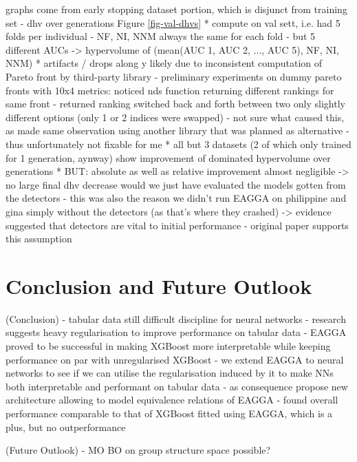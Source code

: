 \documentclass[twoside,11pt]{article}
\begin{document}
    graphs come from early stopping dataset portion, which is disjunct from training set
- dhv over generations Figure \ref{fig-val-dhvs}
  * compute on val sett, i.e. had 5 folds per individual
    - NF, NI, NNM always the same for each fold
    - but 5 different AUCs
    -> hypervolume of (mean(AUC 1, AUC 2, ..., AUC 5), NF, NI, NNM)
  * artifacts / drops along y likely due to inconsistent computation of Pareto front by third-party library
    - preliminary experiments on dummy pareto fronts with 10x4 metrics: noticed nds function returning different rankings for same front
    - returned ranking switched back and forth between two only slightly different options (only 1 or 2 indices were swapped)
    - not sure what caused this, as made same observation using another library that was planned as alternative
    - thus unfortunately not fixable for me
  * all but 3 datasets (2 of which only trained for 1 generation, aynway) show improvement of dominated hypervolume over generations
  * BUT: absolute as well as relative improvement almost negligible -> no large final dhv decrease would we just have evaluated the models gotten from the detectors
    - this was also the reason we didn't run EAGGA on philippine and gina simply without the detectors (as that's where they crashed) -> evidence suggested that detectors are vital to initial performance
    - original paper supports this assumption \citep[Fig. 4, p. 545]{EAGGA}


\section{Conclusion and Future Outlook}
(Conclusion)
- tabular data still difficult discipline for neural networks
- research suggests heavy regularisation to improve performance on tabular data
- EAGGA proved to be successful in making XGBoost more interpretable while keeping performance on par with unregularised XGBoost
- we extend EAGGA to neural networks to see if we can utilise the regularisation induced by it to make NNs both interpretable and performant on tabular data
- as consequence propose new architecture allowing to model equivalence relations of EAGGA
- found overall performance comparable to that of XGBoost fitted using EAGGA, which is a plus, but no outperformance

(Future Outlook)
- MO BO on group structure space possible?

\end{document}
